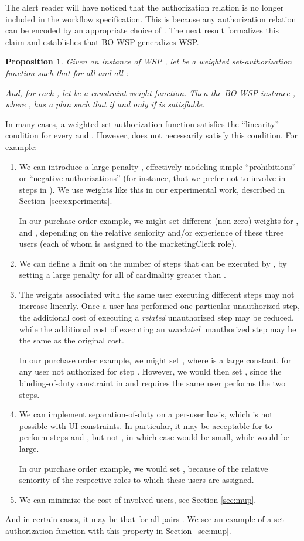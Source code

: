 \documentclass[jcs,crcready]{iosart1c}
\newtheorem{prop}{Proposition}
\newcommand{\BOWSP}{\textsc{BO-WSP}\xspace}
\begin{document}
The alert reader will have noticed that the authorization relation is no longer included in the workflow specification.
This is because any authorization relation  can be encoded by an appropriate choice of .
The next result formalizes this claim and establishes that \BOWSP generalizes WSP.

\begin{prop}\label{pro}
 Given an instance of WSP , let  be a weighted set-authorization function such that for all  and all :
  
  And, for each , let  be a constraint weight function.
 Then the \BOWSP instance , where , has a plan  such that  if and only if  is satisfiable.
\end{prop}

In many cases, a weighted set-authorization function  satisfies the ``linearity'' condition  for every  and .
However,  does not necessarily satisfy this condition. For example:
\begin{enumerate}
 \item We can introduce a large penalty , effectively modeling simple ``prohibitions'' or ``negative authorizations'' (for instance, that we prefer not to involve  in steps in ).
We use weights like this in our experimental work, described in Section~\ref{sec:experiments}.

In our purchase order example, we might set different (non-zero) weights for ,  and , depending on the relative seniority and/or experience of these three users (each of whom is assigned to the \textsf{marketingClerk} role).
 \item We can define a limit  on the number of steps that can be executed by , by setting a large penalty  for all  of cardinality greater than .
 \item The weights associated with the same user executing different steps may not increase linearly.
 Once a user has performed one particular unauthorized step, the additional cost of executing a \emph{related} unauthorized step may be reduced, while the additional cost of executing an \emph{unrelated} unauthorized step may be the same as the original cost.
 
 In our purchase order example, we might set , where  is a large constant, for any user not authorized for step .
 However, we would then set , since the binding-of-duty constraint in  and  requires the same user performs the two steps.
 \item We can implement separation-of-duty on a per-user basis, which is not possible with UI constraints.  In particular, it may be acceptable for  to perform steps  and , but not , in which case  would be small, while  would be large.
 
 In our purchase order example, we would set , because of the relative seniority of the respective roles to which these users are assigned.
  \item We can minimize the cost of involved users, see Section \ref{sec:mup}.
\end{enumerate}
And in certain cases, it may be that  for all pairs .
We see an example of a set-authorization function with this property in Section~\ref{sec:mup}.
\end{document}
